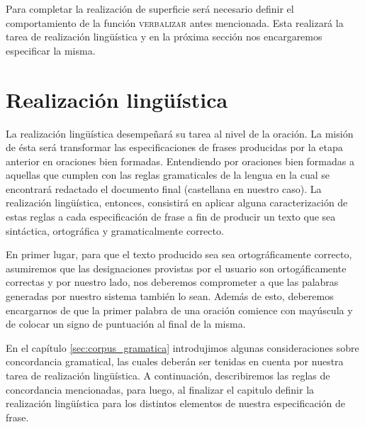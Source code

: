 Para completar la realización de superficie será necesario definir el comportamiento de la función \textsc{verbalizar} antes mencionada. Esta realizará la tarea de realización lingüística y en la próxima sección nos encargaremos especificar la misma.





\section{Realización lingüística}
\label{cap:linguistic_realization}

La realización lingüística desempeñará su tarea al nivel de la oración. La misión de ésta será transformar las especificaciones de frases producidas por la etapa anterior en oraciones bien formadas. Entendiendo por oraciones bien formadas a aquellas que cumplen con las reglas gramaticales de la lengua en la cual se encontrará redactado el documento final (castellana en nuestro caso). La realización lingüística, entonces, consistirá en aplicar alguna caracterización de estas reglas a cada especificación de frase a fin de producir un texto que sea sintáctica, ortográfica y gramaticalmente correcto.

En primer lugar, para que el texto producido sea sea ortográficamente correcto, asumiremos que las designaciones provistas por el usuario son ortogáficamente correctas y por nuestro lado, nos deberemos comprometer a que las palabras generadas por nuestro sistema también lo sean. Además de esto, deberemos encargarnos de que la primer palabra de una oración comience con mayúscula y de colocar un signo de puntuación al final de la misma.

En el capítulo \ref{sec:corpus_gramatica} introdujimos algunas consideraciones sobre concordancia gramatical, las cuales deberán ser tenidas en cuenta por nuestra tarea de realización lingüística. A continuación, describiremos las reglas de concordancia mencionadas, para luego, al finalizar el capitulo definir la realización lingüística para los distintos elementos de nuestra especificación de frase.

